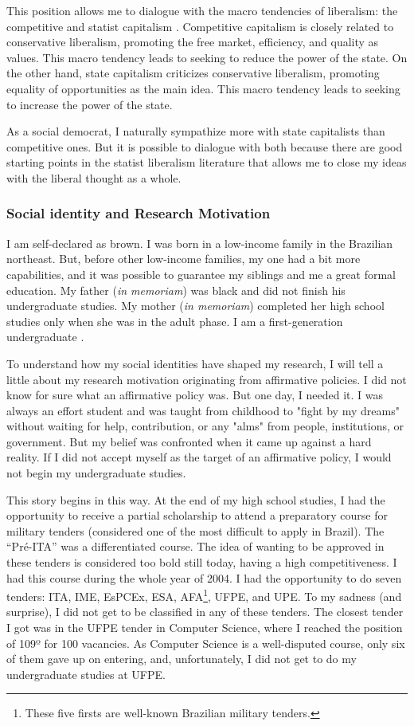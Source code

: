 This position allows me to dialogue with the macro tendencies of liberalism: the competitive and statist capitalism \cite[pp.~84-95]{libaneo:2011}. Competitive capitalism is closely related to conservative liberalism, promoting the free market, efficiency, and quality as values. This macro tendency leads to seeking to reduce the power of the state. On the other hand, state capitalism criticizes conservative liberalism, promoting equality of opportunities as the main idea. This macro tendency leads to seeking to increase the power of the state. 

As a social democrat, I naturally sympathize more with state capitalists than competitive ones. But it is possible to dialogue with both because there are good starting points in the statist liberalism literature that allows me to close my ideas with the liberal thought as a whole.

\subsubsection{Social identity and Research Motivation}

I am self-declared as brown. I was born in a low-income family in the Brazilian northeast. But, before other low-income families, my one had a bit more capabilities, and it was possible to guarantee my siblings and me a great formal education. My father (\textit{in memoriam}) was black and did not finish his undergraduate studies. My mother (\textit{in memoriam}) completed her high school studies only when she was in the adult phase. I am a first-generation undergraduate \cite{ives:2020}.

To understand how my social identities have shaped my research, I will tell a little about my research motivation originating from affirmative policies. I did not know for sure what an affirmative policy was. But one day, I needed it. I was always an effort student and was taught from childhood to "fight by my dreams" without waiting for help, contribution, or any "alms" from people, institutions, or government. But my belief was confronted when it came up against a hard reality. If I did not accept myself as the target of an affirmative policy, I would not begin my undergraduate studies.

This story begins in this way. At the end of my high school studies, I had the opportunity to receive a partial scholarship to attend a preparatory course for military tenders (considered one of the most difficult to apply in Brazil). The “Pré-ITA” was a differentiated course. The idea of wanting to be approved in these tenders is considered too bold still today, having a high competitiveness. I had this course during the whole year of 2004. I had the opportunity to do seven tenders: ITA, IME, EsPCEx, ESA, AFA\footnote{These five firsts are well-known Brazilian military tenders.}, \gls{UFPE}, and \gls{UPE}. To my sadness (and surprise), I did not get to be classified in any of these tenders. The closest tender I got was in the \gls{UFPE} tender in Computer Science, where I reached the position of 109º for 100 vacancies. As Computer Science is a well-disputed course, only six of them gave up on entering, and, unfortunately, I did not get to do my undergraduate studies at \gls{UFPE}.

